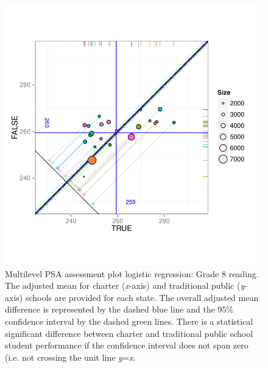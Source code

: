 \begin{figure}[h!]
\begin{center}
\includegraphics[width=\textwidth,trim=0 .6in 0 .6in]{../Figures2009/g8read-mlpsa-lr-circ.pdf}
\caption[Multilevel PSA assessment plot logistic regression: Grade 8 reading]{Multilevel PSA assessment plot logistic regression: Grade 8 reading. The adjusted mean for charter (\textit{x}-axis) and traditional public (\textit{y}-axis) schools are provided for each state. The overall adjusted mean difference is represented by the dashed blue line and the 95\% confidence interval by the dashed green lines. There is a statistical significant difference between charter and traditional public school student performance if the confidence interval does not span zero (i.e. not crossing the unit line \textit{y}=\textit{x}.}
\end{center}
\end{figure}

